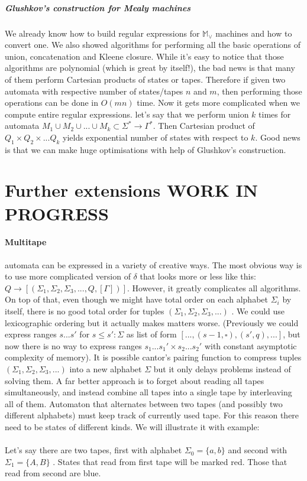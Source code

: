 \documentclass[12pt]{article}
\begin{document}
\subparagraph{Glushkov's construction for Mealy machines}

We already know how to build regular expressions for $\mathbb{M}_\vee$ machines and how to convert one. We also showed algorithms for performing all the basic operations of union, concatenation and Kleene closure. While it's easy to notice that  those algorithms are polynomial (which is great by itself!), the bad news is that many of them perform Cartesian products of states or tapes. Therefore if given two automata with respective number of states/tapes $n$ and $m$, then performing those operations can be done in $O(mn)$ time. Now it gets more complicated when we compute entire regular expressions. let's say that we perform union $k$ times for automata $M_1 \cup M_2 \cup ... \cup M_k \subset \Sigma^* \rightarrow \Gamma^*$. Then Cartesian product of $Q_1 \times Q_2 \times... Q_k$ yields exponential number of states with respect to $k$. Good news is that we can make huge optimisations with help of Glushkov's construction.



\section{Further extensions WORK IN PROGRESS}

\paragraph{Multitape} automata can be expressed in a variety of creative ways. The most obvious way is to use more complicated version of $\delta$ that looks more or less like this: $Q \rightarrow [ (\Sigma_1 ,  \Sigma_2 ,  \Sigma_3 , ... , Q , [ \Gamma ])]$. However, it greatly complicates all algorithms. On top of that, even though we might have total order on each alphabet $\Sigma_i$ by itself, there is no good total order for tuples $(\Sigma_1 ,  \Sigma_2 ,  \Sigma_3 , ... )$ . We could use lexicographic ordering but it actually makes matters worse. (Previously we could express ranges $s ... s'$ for $s\le s':\Sigma$ as list of form $[ ...,(s-1,\square),(s',q), ...]$, but now there is no way to express ranges $s_1...s_1' \times s_2...s_2'$ with constant asymptotic complexity of memory). It is possible cantor's pairing function to compress tuples $(\Sigma_1 ,  \Sigma_2 ,  \Sigma_3 , ...) $ into a new alphabet $\Sigma$ but it only delays problems instead of solving them. A far better approach is to forget about reading all tapes simultaneously, and instead combine all tapes into a single tape by interleaving all of them. Automaton that alternates between two tapes (and possibly two different alphabets) must keep track of currently used tape. For this reason there need to be  states of different kinds. We will illustrate it with example: \\
\\
Let's say there are two tapes, first with alphabet $\Sigma_0=\{ a , b\}$ and second with  $\Sigma_1=\{A,B\}$ . States that read from first tape will be marked red. Those that read from second are blue.
\end{document}
